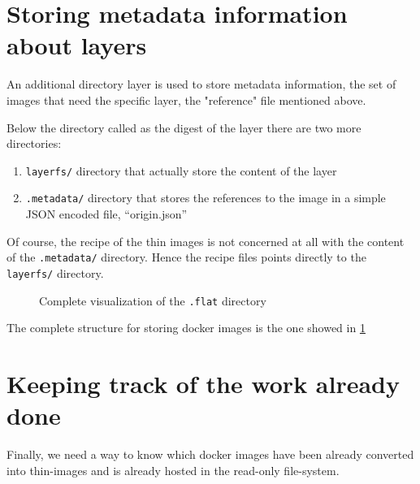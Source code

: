 \section{Storing metadata information about layers}

An additional directory layer is used to store metadata information, the set of images that need the specific layer, the "reference" file mentioned above.

Below the directory called as the digest of the layer there are two more directories: 
\begin{enumerate} 
        \item \texttt{layerfs/} directory that actually store the content of the layer
        \item \texttt{.metadata/} directory that stores the references to the image in a simple JSON encoded file, “origin.json”
\end{enumerate}

Of course, the recipe of the thin images is not concerned at all with the content of the \texttt{.metadata/} directory. 
Hence the recipe files points directly to the \texttt{layerfs/} directory.

\begin{figure}
\caption{Complete visualization of the \texttt{.flat} directory}
\label{fig:docker-layer-structure}
\end{figure}

The complete structure for storing docker images is the one showed in \ref{fig:docker-layer-structure}

\section{Keeping track of the work already done}

Finally, we need a way to know which docker images have been already converted into thin-images and is already hosted in the read-only file-system.

